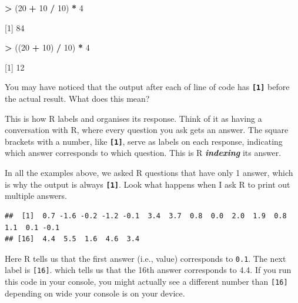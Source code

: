 \documentclass[
]{book}
\newenvironment{Shaded}{\begin{snugshade}}{\end{snugshade}}
\newcommand{\CommentTok}[1]{\textcolor[rgb]{0.56,0.35,0.01}{\textit{#1}}}
\newcommand{\DecValTok}[1]{\textcolor[rgb]{0.00,0.00,0.81}{#1}}
\newcommand{\FunctionTok}[1]{\textcolor[rgb]{0.13,0.29,0.53}{\textbf{#1}}}
\newcommand{\NormalTok}[1]{#1}
\newcommand{\SpecialCharTok}[1]{\textcolor[rgb]{0.81,0.36,0.00}{\textbf{#1}}}
\begin{document}
\begin{Shaded}
\begin{Highlighting}[]
\SpecialCharTok{\textgreater{}}\NormalTok{ (}\DecValTok{20} \SpecialCharTok{+} \DecValTok{10} \SpecialCharTok{/} \DecValTok{10}\NormalTok{) }\SpecialCharTok{*} \DecValTok{4} 

\NormalTok{[}\DecValTok{1}\NormalTok{] }\DecValTok{84}

\SpecialCharTok{\textgreater{}}\NormalTok{ ((}\DecValTok{20} \SpecialCharTok{+} \DecValTok{10}\NormalTok{) }\SpecialCharTok{/} \DecValTok{10}\NormalTok{) }\SpecialCharTok{*} \DecValTok{4}

\NormalTok{[}\DecValTok{1}\NormalTok{] }\DecValTok{12}
\end{Highlighting}
\end{Shaded}

You may have noticed that the output after each of line of code has \textbf{\texttt{{[}1{]}}} before the actual result. What does this mean?

This is how R labels and organises its response. Think of it as having a conversation with R, where every question you ask gets an answer. The square brackets with a number, like \textbf{\texttt{{[}1{]}}}, serve as labels on each response, indicating which answer corresponds to which question. This is R \textbf{\emph{indexing}} its answer.

In all the examples above, we asked R questions that have only 1 answer, which is why the output is always \textbf{\texttt{{[}1{]}}}. Look what happens when I ask R to print out multiple answers.

\begin{Shaded}
\end{Shaded}

\begin{verbatim}
##  [1]  0.7 -1.6 -0.2 -1.2 -0.1  3.4  3.7  0.8  0.0  2.0  1.9  0.8  1.1  0.1 -0.1
## [16]  4.4  5.5  1.6  4.6  3.4
\end{verbatim}

Here R tells us that the first answer (i.e., value) corresponds to \texttt{0.1}. The next label is \texttt{{[}16{]}}. which tells us that the 16th answer corresponds to 4.4. If you run this code in your console, you might actually see a different number than \texttt{{[}16{]}} depending on wide your console is on your device.
\end{document}
